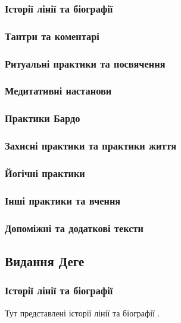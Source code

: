 \documentclass{article}
\begin{document}
\subsubsection{Історії лінії та біографії}
\subsubsection{Тантри та коментарі}
\subsubsection{Ритуальні практики та посвячення}
\subsubsection{Медитативні настанови}
\subsubsection{Практики Бардо}
\subsubsection{Захисні практики та практики життя}
\subsubsection{Йогічні практики}
\subsubsection{Інші практики та вчення}
\subsubsection{Допоміжні та додаткові тексти}

\newpage
\subsection{Видання Деге}

\subsubsection{Історії лінії та біографії}

Тут представлені історії лінії та біографії .
\end{document}
